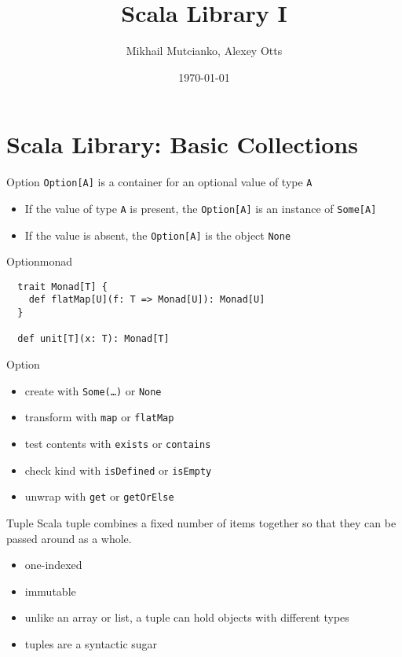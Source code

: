 \documentclass[aspectratio=169]{beamer}
\title{Scala Library I}
\author{Mikhail Mutcianko, Alexey Otts}
\institute{СПБгУ, СП}
\date{\today}
\begin{document}
\frame{\titlepage}

\section{Scala Library: Basic Collections}

\begin{frame}{Option}
\texttt{Option[A]} is a container for an optional value of type \texttt{A}
\vspace{1em}
\begin{itemize}
  \item If the value of type \texttt{A} is present, the \texttt{Option[A]} is an instance of \texttt{Some[A]}
  \item If the value is absent, the \texttt{Option[A]} is the object \texttt{None}
\end{itemize}
\end{frame}

\begin{frame}[fragile]{Option}{monad}
\begin{verbatim}
  trait Monad[T] {
    def flatMap[U](f: T => Monad[U]): Monad[U]
  }

  def unit[T](x: T): Monad[T]
\end{verbatim}
\end{frame}

\begin{frame}{Option}
\begin{itemize}
  \item create with \texttt{Some(\ldots)} or \texttt{None}
  \item transform with \texttt{map} or \texttt{flatMap}
  \item test contents with \texttt{exists} or \texttt{contains}
  \item check kind with \texttt{isDefined} or \texttt{isEmpty}
  \item unwrap with \texttt{get} or \texttt{getOrElse}
\end{itemize}
\end{frame}

\begin{frame}[fragile]{Tuple}
  Scala tuple combines a fixed number of items together so that they can be passed around as a
  whole.
  \begin{itemize}
    \item one-indexed
    \item immutable
    \item unlike an array or list, a tuple can hold objects with different types
    \item tuples are a syntactic sugar
  \end{itemize}
  \pause
\end{frame}
\end{document}
